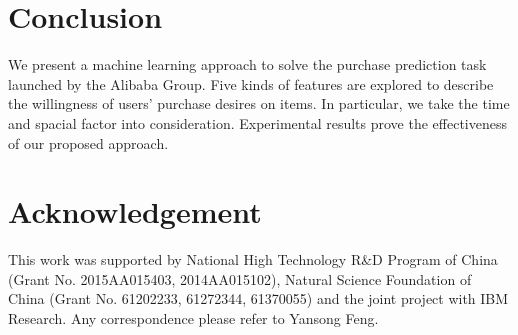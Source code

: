 \documentclass{llncs}
\begin{document}
\section{Conclusion}
We present a machine learning approach to solve
the purchase prediction task launched by the Alibaba Group.
Five kinds of features are explored to describe
the willingness of users' purchase desires on items.
In particular, we take the time and spacial factor into consideration.
Experimental results prove the effectiveness of our proposed approach.


\section*{Acknowledgement}
This work was supported by National High Technology R\&D Program of China (Grant No. 2015AA015403, 2014AA015102),
Natural Science Foundation of China (Grant No. 61202233, 61272344, 61370055) and the joint project with IBM Research.
Any correspondence please refer to Yansong Feng.



\end{document}
